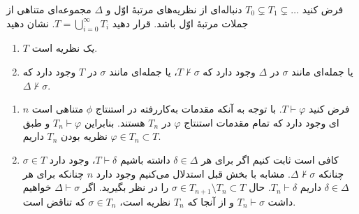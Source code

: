 فرض کنید $T_0 \varsubsetneq T_1 \varsubsetneq \dots$ دنباله‌ای از نظریه‌های مرتبهٔ اوّل و $\Delta$ مجموعه‌ای متناهی از جملات مرتبهٔ اوّل باشد. قرار دهید $T = \bigcup_{i=0}^\infty T_i$. نشان دهید
\begin{enumerate}[label=(\alph*)]
  \item $T$ یک نظریه است.
  ~
  \item یا جمله‌ای مانند $\sigma$ در $\Delta$ وجود دارد که $T \not\vdash \sigma$، یا جمله‌ای مانند $\sigma$ در $T$ وجود دارد که $\Delta \not\vdash \sigma$.
  ~
\end{enumerate}\quad
\begin{ans}
  \begin{enumerate}[label=(\alph*)]
    \item فرض کنید $T\vdash\varphi$.
    با توجه به آنکه مقدمات به‌کاررفته در استنتاج $\phi$ متناهی است $n$ای وجود دارد که تمام مقدمات استنتاج
    $\varphi$
    در
    $T_n$
    هستند. بنابراین
    $T_n\vdash\varphi$
    و طبق نظریه بودن $T_n$
    داریم
    $\varphi\in T_n\subset T$.
    \item کافی است ثابت کنیم اگر برای هر
    $\delta\in\Delta$ داشته باشیم
    $T\vdash\delta$،
    وجود دارد
    $\sigma\in T$
    چنانکه
    $\Delta\not\vdash\sigma$. مشابه با بخش قبل استدلال می‌کنیم وجود دارد $n$ چنانکه برای هر
    $\delta\in\Delta$
    داریم
    $T_n\vdash\delta$.
    حال $\sigma\in T_{n+1}\setminus T_n\subset T$
    را در نظر بگیرید. اگر
    $\Delta\vdash\sigma$
    خواهیم داشت
    $T_n\vdash\sigma$
    و از آنجا که
    $T_n$
    نظریه است،
    $\sigma\in T_n$
    که تناقض است.
  \end{enumerate}
\end{ans}